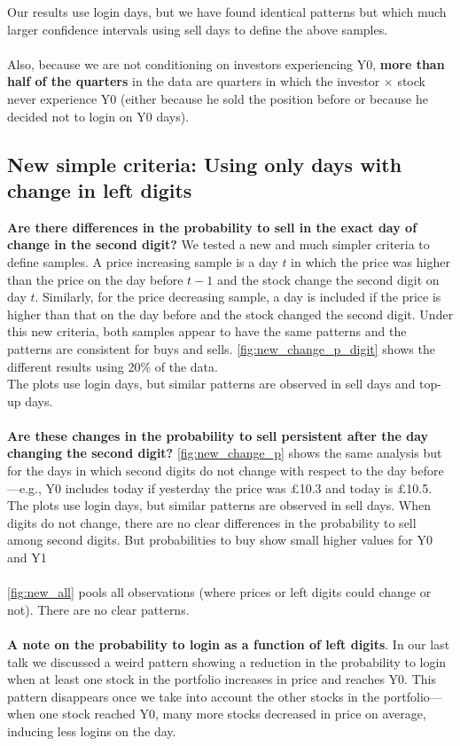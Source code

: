 \documentclass[
	USenglish,12pt,paper=a4,numbers=noenddot,abstract=on,
	final,%
	fullsample,
    ]{scrartcl}
\begin{document}
Our results use login days, but we have found identical patterns but which much larger confidence intervals using sell days to define the above samples. \\ \\
Also, because we are not conditioning on investors experiencing Y0,\textbf{ more than half of the quarters} in the data are quarters in which the investor $\times$ stock never experience Y0 (either because he sold the position before or because he decided not to login on Y0 days).
\subsection{New simple criteria: Using only days with change in left digits}
\textbf{Are there differences in the probability to sell in the exact day of change in the second digit?}
We tested a new and much simpler criteria to define samples. A price increasing sample is a day $t$ in which the price was higher than the price on the day before $t-1$ and the stock change the second digit on day $t$. Similarly, for the price decreasing sample, a day is included if the price is higher than that on the day before and the stock changed the second digit. Under this new criteria, both samples appear to have the same patterns and the patterns are consistent for buys and sells. \ref{fig:new_change_p_digit} shows the different results using 20\% of the data. \\
The plots use login days, but similar patterns are observed in sell days and top-up days.
\\ \\
\textbf{Are these changes in the probability to sell persistent after the day changing the second digit?} \ref{fig:new_change_p} shows the same analysis but for the days in which  second digits do not change with respect to the day before---e.g., Y0 includes today if yesterday the price was £10.3 and today is £10.5. \\
The plots use login days, but similar patterns are observed in sell days. When digits do not change, there are no clear differences in the probability to sell among second digits. But probabilities to buy show small higher values for Y0 and Y1
 \\ \\
 \ref{fig:new_all} pools all observations (where prices or left digits could change or not). There are no clear patterns.
 \\ \\
\textbf{A note on the probability to login as a function of left digits}.
In our last talk we discussed a weird pattern showing a reduction in the probability to login when at least one stock in the portfolio increases in price and reaches Y0. This pattern disappears once we take into account the other stocks in the portfolio---when one stock reached Y0, many more stocks decreased in price on average, inducing less logins on the day.
\end{document}
